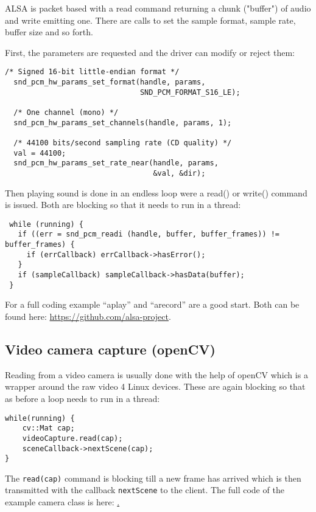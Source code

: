 \documentclass[12pt]{report}
\begin{document}
ALSA is packet based with a read command
returning a chunk ("buffer") of audio and write emitting one.
There are calls to set the sample format, sample rate, buffer size
and so forth.

First, the parameters are requested and the driver can modify or
reject them:
\begin{verbatim}
/* Signed 16-bit little-endian format */
  snd_pcm_hw_params_set_format(handle, params,
                               SND_PCM_FORMAT_S16_LE);

  /* One channel (mono) */
  snd_pcm_hw_params_set_channels(handle, params, 1);

  /* 44100 bits/second sampling rate (CD quality) */
  val = 44100;
  snd_pcm_hw_params_set_rate_near(handle, params,
                                  &val, &dir);
\end{verbatim}

Then playing sound is done in an endless loop were a read()
or write() command is issued. Both are blocking so that
it needs to run in a thread:

\begin{verbatim}
 while (running) {
   if ((err = snd_pcm_readi (handle, buffer, buffer_frames)) != buffer_frames) {
     if (errCallback) errCallback->hasError();
   }
   if (sampleCallback) sampleCallback->hasData(buffer);
 }
\end{verbatim}

For a full coding example ``aplay'' and ``arecord'' are a good start.
Both can be found here:
\url{https://github.com/alsa-project}.


\subsection{Video camera capture (openCV)}

Reading from a video camera is usually done with the help of openCV which is a wrapper
around the raw video 4 Linux devices. These are again blocking so that as before
a loop needs to run in a thread:
\begin{verbatim}
while(running) {
    cv::Mat cap;
    videoCapture.read(cap);
    sceneCallback->nextScene(cap);
}
\end{verbatim}
The \texttt{read(cap)} command is blocking till a new frame has
arrived which is then transmitted with the callback \texttt{nextScene}
to the client. The full code of the example camera class is here:
\href{https://github.com/berndporr/opencv-camera-callback}.
\end{document}
